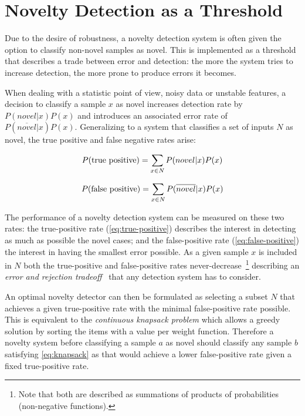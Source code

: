 \section{Novelty Detection as a Threshold}
Due to the desire of robustness, a novelty detection system is often given the option
to classify non-novel samples as novel. This is implemented as a threshold that describes a trade
between error and detection: the more the system tries to increase detection, the more
prone to produce errors it becomes.

When dealing with a statistic point of view, noisy data or unstable features,
a decision to classify a sample $x$ as novel increases detection rate by
$P(novel|x)P(x)$ and introduces an associated error rate of $P(\overline{novel}|x)P(x)$.
Generalizing to a system that classifies a set of inputs $N$ as novel, the
true positive and false negative rates arise:

\begin{equation}
\label{eq:true-positive}
P(\textnormal{true positive}) = \sum_{x \in N}{P(novel|x)P(x)}
\end{equation}

\begin{equation}
\label{eq:false-positive}
P(\textnormal{false positive}) = \sum_{x \in N}{P(\overline{novel}|x)P(x)}
\end{equation}

The performance of a novelty detection system can be measured on these two
rates: the true-positive rate (\autoref{eq:true-positive}) describes the
interest in detecting as much as possible the novel cases;
and the false-positive rate (\autoref{eq:false-positive}) the interest in
having the smallest error possible.
As a given sample $x$ is included in $N$ both the true-positive and
false-positive rates never-decrease~\footnote{Note that both are described as
summations of products of probabilities (non-negative functions).} describing an
\emph{error and rejection tradeoff}~\cite{chow1970optimum} that any detection
system has to consider.

An optimal novelty detector can then be formulated as selecting a subset $N$
that achieves a given true-positive rate with the minimal false-positive
rate possible. This is equivalent to the \emph{continuous knapsack problem}
which allows a greedy solution by sorting the items with a value per weight
function.
Therefore a novelty system before classifying a sample $a$ as novel should
classify any sample $b$ satisfying \autoref{eq:knapsack} as that would achieve
a lower false-positive rate given a fixed true-positive rate.

